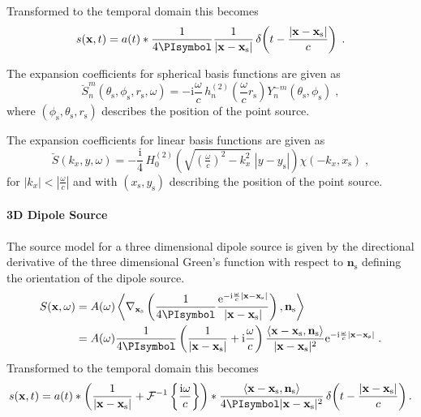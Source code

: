 \documentclass[a4paper]{book}
\newcommand{\reproduce}[1]{%
    \href{#1}{\color{link}\large\Pointinghand}%
}%
\newcommand{\ft}{\footnotesize}                                   %
\newcommand{\PI}{\PIsymbol}%
\newcommand{\I}{\mathrm{i}}                          %
\newcommand{\E}{\mathrm{e}}                          %
\renewcommand{\vec}[1]{\mathbf{#1}}                  %
\newcommand{\x}{\vec{x}}                             %
\newcommand{\xs}{\x_\text{s}}                        %
\newcommand{\n}{\vec{n}}                             %
\newcommand{\ns}{\n_\text{s}}                        %
\newcommand{\omegac}{\frac{\omega}{c}}               %
\renewcommand{\H}[2]{\,H_{#1}^{(#2)}\!}              %
\newcommand{\deltafunc}[1]{\,\delta\!\left(#1\right)}%
\newcommand{\IFT}[1]{%
    \mathcal{F}^{-1}\left\{#1\right\}}%
\newcommand{\qc}{\;,}                                             %
\newcommand{\qp}{\;.}                                             %
\newcommand\eqlabel[2][]{%
  \label{eq:#2}%
}
\begin{document}
{Transformed to the temporal domain this becomes
%
\begin{equation}
    s(\x,t) = a(t) * \frac{1}{4\PI} \frac{1}{|\x-\xs|}
    \deltafunc{t - \frac{|\x-\xs|}{c}}
    \qp
    \eqlabel{s:ps}
\end{equation}
%

The expansion coefficients for spherical basis functions are given
as\cite[][(2.37)]{Ahrens2012}
%
\begin{equation}
    \breve{S}_n^m(\theta_\text{s},\phi_\text{s},r_\text{s},\omega) =
    -\I \omegac \, h_n^{(2)}\!\!\left(\omegac r_\text{s}\right)
    Y_n^{-m}(\theta_\text{s},\phi_\text{s}) \qc
    \label{eq:point_source_spherical}
\end{equation}
%
where $(\phi_\text{s},\theta_\text{s},r_\text{s})$ describes the position of the
point source.

The expansion coefficients for linear basis functions are given
as\cite[][(C.10)]{Ahrens2012}
%
\begin{equation}
    \breve{S}(k_x,y,\omega) =
    -\frac{\I}{4} \H{0}{2} \left( \sqrt{(\tfrac{\omega}{c})^2-k_x^2} \;
        |y-y_\text{s}| \right) \chi(-k_x,x_\text{s}) \qc
    \label{eq:point_source_linear}
\end{equation}
%
for $|k_x|<|\omegac|$ and with $(x_\text{s},y_\text{s})$ describing the position
of the point source.

\paragraph{3D Dipole Source}
\label{sec:dipole_source_3D}
%
The source model for a three dimensional dipole source is given by the
directional derivative of the three dimensional Green's function with respect to
\(\ns\) defining the orientation of the dipole source.
%
\begin{equation}
  \begin{aligned}
  S(\x,\omega) &= A(\omega) 
  \left\langle
    \nabla_{\xs} \left( \frac{1}{4\PI} \frac{\E^{-\I\omegac|\x-\xs|}}{|\x-\xs|}
    \right), \ns
  \right\rangle \\
  &=
    A(\omega)
    \frac{1}{4\PI} 
    \left( \frac{1}{|\x-\xs|} + \I \omegac \right)
    \frac{\langle \x-\xs, \ns \rangle}{|\x-\xs|^2}
    \E^{-\I\omegac|\x-\xs|}
  \qp
  \end{aligned}
  \eqlabel{S:dps}
\end{equation}
%
%  
%
Transformed to the temporal domain this becomes
%
\begin{equation}
  s(\x,t) = a(t) *
  \left( \frac{1}{|\x-\xs|} + \IFT{ \frac{\I\omega}{c} } \right)
  *
  \frac{\langle \x-\xs, \ns \rangle}{4\PI |\x-\xs|^2}
  \deltafunc{t - \frac{|\x-\xs|}{c}} .
  \eqlabel{s:dps}
\end{equation}
%

}
\end{document}
